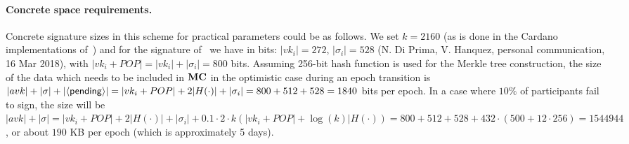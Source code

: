 \paragraph{Concrete space requirements.}
Concrete signature sizes in this scheme for practical parameters
could be as follows.
We set $k = 2160$ (as is done in the Cardano implementations of~\cite{ouroboros})
and for the signature of~\cite{boldyreva2003threshold} we have
 in bits: $|vk_i| = 272$, $|\sigma_i| = 528$
 (N. Di Prima, V. Hanquez, personal communication, 16 Mar 2018), with
 $|vk_i + POP| = |vk_i| + |\sigma_i| = 800$ bits.
 Assuming
256-bit
hash function is used for the Merkle tree construction,
the size of the data which needs to be included
in $\mathbf{MC}$ in the optimistic case during an epoch transition is
$|avk| + |\sigma| + |\langle\mathsf{pending}\rangle| =
|vk_i + POP| + 2|H(\cdot)| + |\sigma_i| = 800 + 512 + 528 = 1840$ bits per epoch. In
a case where $10\%$ of participants fail to sign, the size will be $|avk| +
|\sigma| = |vk_i + POP| + 2|H(\cdot)| + |\sigma_i| + 0.1  \cdot  2  \cdot  k(|vk_i + POP| + \log(k)|H(\cdot))
= 800 + 512 + 528 + 432  \cdot  (500 + 12  \cdot  256) = 1544944$, or about $190$ KB per
epoch (which is approximately 5 days).



